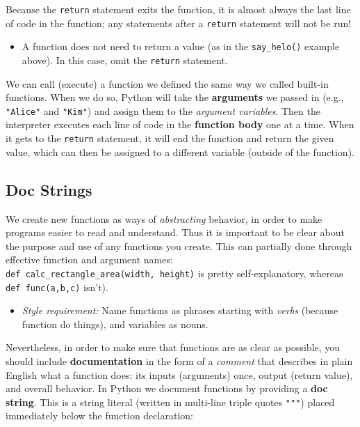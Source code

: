 \documentclass[]{book}
\providecommand{\tightlist}{%
  \setlength{\itemsep}{0pt}\setlength{\parskip}{0pt}}
\begin{document}
Because the \texttt{return} statement exits the function, it is almost
always the last line of code in the function; any statements after a
\texttt{return} statement will not be run!

\begin{itemize}
\tightlist
\item
  A function does not need to return a value (as in the
  \texttt{say\_helo()} example above). In this case, omit the
  \texttt{return} statement.
\end{itemize}

We can call (execute) a function we defined the same way we called
built-in functions. When we do so, Python will take the
\textbf{arguments} we passed in (e.g., \texttt{"Alice"} and
\texttt{"Kim"}) and assign them to the \emph{argument variables}. Then
the interpreter executes each line of code in the \textbf{function body}
one at a time. When it gets to the \texttt{return} statement, it will
end the function and return the given value, which can then be assigned
to a different variable (outside of the function).

\hypertarget{doc-strings}{\subsection{Doc Strings}\label{doc-strings}}

We create new functions as ways of \emph{abstracting} behavior, in order
to make programs easier to read and understand. Thus it is important to
be clear about the purpose and use of any functions you create. This can
partially done through effective function and argument names:
\texttt{def\ calc\_rectangle\_area(width,\ height)} is pretty
self-explanatory, whereas \texttt{def\ func(a,b,c)} isn't).

\begin{itemize}
\tightlist
\item
  \emph{Style requirement:} Name functions as phrases starting with
  \emph{verbs} (because function do things), and variables as nouns.
\end{itemize}

Nevertheless, in order to make sure that functions are as clear as
possible, you should include \textbf{documentation} in the form of a
\emph{comment} that describes in plain English what a function does: its
inputs (arguments) once, output (return value), and overall behavior. In
Python we document functions by providing a \textbf{doc string}. This is
a string literal (written in multi-line triple quotes \texttt{"""})
placed immediately below the function declaration:
\end{document}

